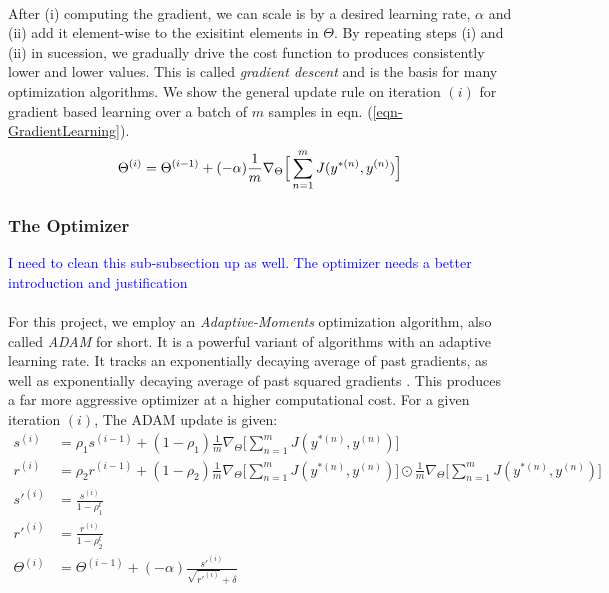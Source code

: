 \documentclass[12pt,letterpaper]{article}
\begin{document}
\paragraph*{}After (i) computing the gradient, we can scale is by a desired learning rate, $\alpha$ and (ii) add it element-wise to the exisitint elements in $\Theta$. By repeating steps (i) and (ii) in sucession, we gradually drive the cost function to produces consistently lower and lower values. This is called \textit{gradient descent} and is the basis for many optimization algorithms. We show the general update rule on iteration $(i)$ for gradient based learning over a batch of $m$ samples in eqn. (\ref{eqn-GradientLearning}).
\begin{equation}
\label{eqn-GradientLearning}
\Theta^{(i)} = \Theta^{(i-1)} + (-\alpha)\frac{1}{m} \nabla_{\Theta} \Big[\sum_{n=1}^{m} J(y^{*(n)},y^{(n)}) \Big] \\
\end{equation}


\subsubsection{The Optimizer}

\textcolor{blue}{I need to clean this sub-subsection up as well. The optimizer needs a better introduction and justification}

\paragraph*{}For this project, we employ an \textit{Adaptive-Moments} optimization algorithm, also called \textit{ADAM} for short. It is a powerful variant of algorithms with an adaptive learning rate. It tracks an exponentially decaying average of past gradients, as well as exponentially decaying average of past squared gradients \cite{Geron}. This produces a far more aggressive optimizer at a higher computational cost. For a given iteration $(i)$, The ADAM update is given:
\begin{equation}
\label{eqn-ADAMupdate}
\begin{split}
s^{(i)} &= \rho_1 s^{(i-1)} + (1 - \rho_1) \frac{1}{m} \nabla_{\Theta} \Big[\sum_{n=1}^{m} J(y^{*(n)},y^{(n)}) \Big]  \\
r^{(i)} &= \rho_2 r^{(i-1)} + (1 - \rho_2) \frac{1}{m} \nabla_{\Theta} \Big[\sum_{n=1}^{m} J(y^{*(n)},y^{(n)}) \Big] \odot
							\frac{1}{m} \nabla_{\Theta} \Big[\sum_{n=1}^{m} J(y^{*(n)},y^{(n)}) \Big]  \\
s'^{(i)} &= \frac{s^{(i)}}{1-\rho_1^t} \\
r'^{(i)} &= \frac{r^{(i)}}{1-\rho_2^t} \\
\Theta^{(i)} &= \Theta^{(i-1)} + (-\alpha)\frac{s'^{(i)}}{\sqrt{r'^{(i)}}+\delta} \\
\end{split}
\end{equation}
\end{document}
